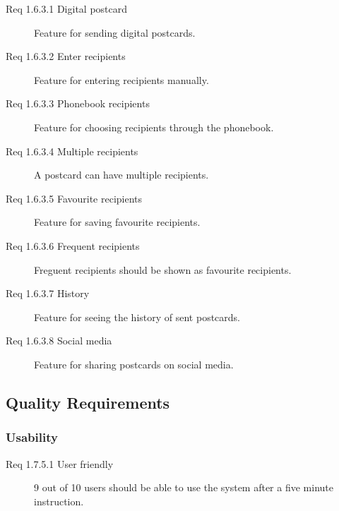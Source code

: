 \documentclass[10pt,a4paper]{article}
\begin{document}
\begin {description}
\item [Req 1.6.3.1 Digital postcard] Feature for sending digital postcards.
\item [Req 1.6.3.2 Enter recipients] Feature for entering recipients manually.
\item [Req 1.6.3.3 Phonebook recipients] Feature for choosing recipients through the phonebook.
\item [Req 1.6.3.4 Multiple recipients] A postcard can have multiple recipients.
\item [Req 1.6.3.5 Favourite recipients] Feature for saving favourite recipients.
\item [Req 1.6.3.6 Frequent recipients] Freguent recipients should be shown as favourite recipients.
\item [Req 1.6.3.7 History] Feature for seeing the history of sent postcards.
\item [Req 1.6.3.8 Social media] Feature for sharing postcards on social media.
\end {description}

\subsection{Quality Requirements}

\subsubsection{Usability}
\begin{description}
\item [Req 1.7.5.1 User friendly] 9 out of 10 users should be able to use the system after a five minute instruction.
\end{description}






\end{document}

